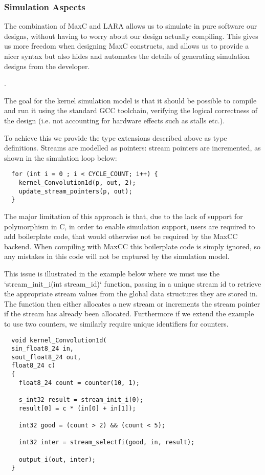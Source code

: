 \subsubsection{Simulation Aspects}
The combination of MaxC and LARA allows us to simulate in pure
software our designs, without having to worry about our design
actually compiling. This gives us more freedom when designing MaxC
constructs, and allows us to provide a nicer syntax but also hides and
automates the details of generating simulation designs from the
developer.

.


The goal for the kernel simulation model is that it should be
possible to compile and run it using the standard GCC
toolchain, verifying the logical correctness of the design
(i.e. not accounting for hardware effects such as stalls
etc.).

To achieve this we provide the type extensions described above
as type definitions. Streams are modelled as pointers:
stream pointers are incremented, as shown in the simulation
loop below:

\lstset{style=MaxC}

\begin{lstlisting}
  for (int i = 0 ; i < CYCLE_COUNT; i++) {
    kernel_Convolution1d(p, out, 2);
    update_stream_pointers(p, out);
  }
\end{lstlisting}

The major limitation of this approach is that, due to the lack of
support for polymorphism in C, in order to enable simulation support,
users are required to add boilerplate code, that would otherwise not
be required by the MaxCC backend. When compiling with MaxCC this
boilerplate code is simply ignored, so any mistakes in this code will
not be captured by the simulation model.

This issue is illustrated in the example below where we must use the
`stream\_init\_i(int stream\_id)` function, passing in a unique stream id
to retrieve the appropriate stream values from the global data
structures they are stored in. The function then either allocates a
new stream or increments the stream pointer if the stream has already
been allocated. Furthermore if we extend the example to use two
counters, we similarly require unique identifiers for counters.

\begin{lstlisting}
  void kernel_Convolution1d(
  sin_float8_24 in,
  sout_float8_24 out,
  float8_24 c)
  {
    float8_24 count = counter(10, 1);

    s_int32 result = stream_init_i(0);
    result[0] = c * (in[0] + in[1]);

    int32 good = (count > 2) && (count < 5);

    int32 inter = stream_selectfi(good, in, result);

    output_i(out, inter);
  }

\end{lstlisting}

